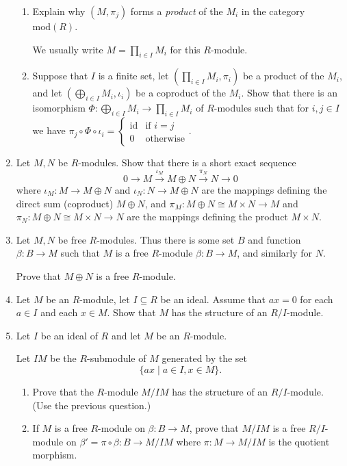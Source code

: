 \documentclass{article}
\begin{document}
\begin{enumerate}
\begin{enumerate}[label=\alph*.]
    \item Explain why $(M, \pi_j)$ forms a \emph{product} of the $M_i$ in the category $\text{mod}(R)$.

    We usually write $M = \prod_{i \in I} M_i$ for this $R$-module.

    \item Suppose that $I$ is a finite set, let $(\prod_{i \in I} M_i, \pi_i)$ be a product of the $M_i$, and let $(\bigoplus_{i \in I} M_i, \iota_i)$ be a coproduct of the $M_i$. Show that there is an isomorphism $\Phi:\bigoplus_{i \in I} M_i \to \prod_{i \in I} M_i$ of $R$-modules such that for $i,j \in I$ we have $\pi_j \circ \Phi \circ \iota_i = \begin{cases} \text{id} & \text{if } i = j \\ 0 & \text{otherwise} \end{cases}$.
\end{enumerate}

\item Let $M,N$ be $R$-modules. Show that there is a short exact sequence
$$0 \to M \xrightarrow{\iota_M} M \oplus N \xrightarrow{\pi_N} N \to 0$$
where $\iota_M:M \to M \oplus N$ and $\iota_N:N \to M \oplus N$ are the mappings defining the direct sum (coproduct) $M \oplus N$, and $\pi_M:M \oplus N \cong M \times N \to M$ and $\pi_N:M \oplus N \cong M \times N \to N$ are the mappings defining the product $M \times N$.

\item
Let $M,N$ be free $R$-modules. Thus there is some set $B$ and function $\beta:B \to M$ such that $M$ is a free $R$-module $\beta:B \to M$, and similarly for $N$.

Prove that $M \oplus N$ is a free $R$-module.

\item 
Let $M$ be an $R$-module, let $I \subseteq R$ be an ideal. Assume that $ax = 0$ for each $a \in I$ and each $x \in M$. Show that $M$ has the structure of an $R/I$-module.

\item
Let $I$ be an ideal of $R$ and let $M$ be an $R$-module.

Let $IM$ be the $R$-submodule of $M$ generated by the set 
$$\{ ax \mid a \in I, x \in M \}.$$

\begin{enumerate}[label=\alph*.]
    \item Prove that the $R$-module $M/IM$ has the structure of an $R/I$-module. (Use the previous question.)

    \item If $M$ is a free $R$-module on $\beta:B \to M$, prove that $M/IM$ is a free $R/I$-module on $\beta' = \pi \circ \beta:B \to M/IM$ where $\pi:M \to M/IM$ is the quotient morphism.
\end{enumerate}

\end{enumerate}
\end{document}
